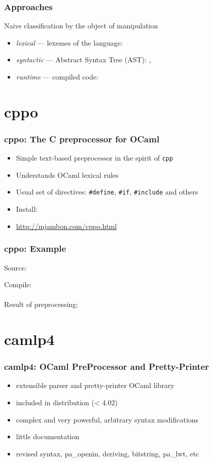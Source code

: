 \begin{frame}
\frametitle{Approaches}
Naive classification by the object of manipulation
\begin{itemize}
\item \emph{lexical} --- lexemes of the language: 
\item \emph{syntactic} --- Abstract Syntax Tree (AST): , 
\item \emph{runtime} --- compiled code: 
\end{itemize}
\end{frame}

\section{cppo}

\begin{frame}
\frametitle{cppo: The C preprocessor for OCaml}
\begin{itemize}
\item Simple text-based preprocessor in the spirit of \texttt{cpp}
\item Understands OCaml lexical rules
\item Usual set of directives: \texttt{\#define}, \texttt{\#if}, \texttt{\#include} and others
\item Install: 
\item \url{http://mjambon.com/cppo.html}
\end{itemize}
\end{frame}

\begin{frame}
\frametitle{cppo: Example}
Source:

Compile:
\\
\\
Result of preprocessing:

\end{frame}

\section{camlp4}

\begin{frame}
\frametitle{camlp4: OCaml PreProcessor and Pretty-Printer}
\begin{itemize}
\item extensible parser and pretty-printer OCaml library
\item included in distribution (< 4.02)
\item complex and very powerful, arbitrary syntax modifications
\item little documentation
\item revised syntax, pa\_openin, deriving, bitstring, pa\_lwt, etc
\end{itemize}
\end{frame}

